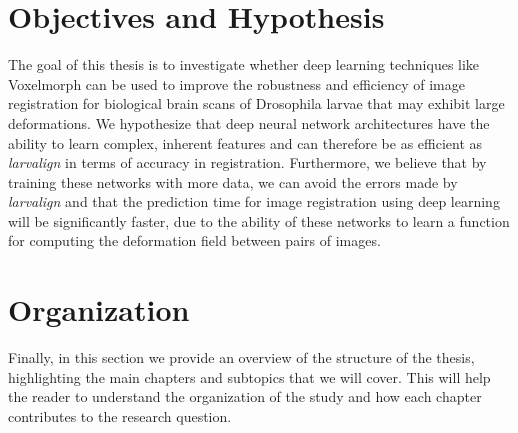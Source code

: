 \documentclass{book}
\begin{document}
	\section{Objectives and Hypothesis}
	The goal of this thesis is to investigate whether deep learning techniques like Voxelmorph \cite{Balakrishnan_2019} can be used to improve the robustness and efficiency of image registration for biological brain scans of Drosophila larvae that may exhibit large deformations. We hypothesize that deep neural network architectures have the ability to learn complex, inherent features and can therefore be as efficient as \textit{larvalign} \cite{larvalign} in terms of accuracy in registration. Furthermore, we believe that by training these networks with more data, we can avoid the errors made by \textit{larvalign} \cite{larvalign} and that the prediction time for image registration using deep learning will be significantly faster, due to the ability of these networks to learn a function for computing the deformation field between pairs of images.

	\section{Organization}
	Finally, in this section we provide an overview of the structure of the thesis, highlighting the main chapters and subtopics that we will cover. This will help the reader to understand the organization of the study and how each chapter contributes to the research question.
	
\end{document}
